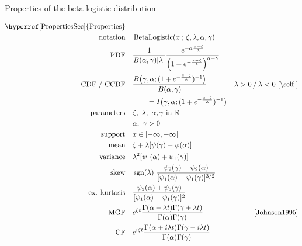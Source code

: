 

\begin{table*}[p]
\caption[Beta-logistic distribution -- Properties]{Properties of the beta-logistic distribution}
\begin{align*}
\text{\hyperref[PropertiesSec]{Properties}}  \quad& \\
\text{notation} \quad &  \op{BetaLogistic}(x\given \pLoc,\pScale,\alpha,\gamma)  
\checked
\\
\text{PDF}\quad &  
\frac{1}{B(\alpha, \gamma) \Left| \pScale\Right|}
 \frac{e^{-\alpha \frac{x-\pLoc}{\pScale} }} { \Left(1 + e^{-\frac{x-\pLoc}{\pScale}  }\Right)^{\alpha+\gamma} }
\checked 
\\
\text{CDF / CCDF} \quad  &  
 \frac{B\big(\gamma, \alpha ;  ( 1+e^{-\frac{x-\pLoc}{\pScale}} )^{-1}  \big) }{B(\alpha,\gamma)}
& \pScale>0 \, \big/ \, \pScale<0 \checked
 \text{ \cite{\self}} \\
& \qquad  = I\big(  \gamma, \alpha;  ( 1+e^{-\frac{x-\pLoc}{\pScale}} )^{-1}  \big) \checked
\\
\text{parameters}\quad &   \pLoc,\ \pScale,\ \alpha, \gamma  \text{ in } \mathbb{R} \checked \\
& \alpha,\ \gamma >0 \checked
\\
\text{support} \quad &   x \in [-\infty,+\infty] \checked
\\
\text{mean} \quad  &  \pLoc +\pScale [ \psi(\gamma)-\psi(\alpha) ]  \checked %
\\
\text{variance} \quad  & \pScale^2 [\psi_1(\alpha) + \psi_1(\gamma) ] \checked %
\\
\text{skew} \quad  &  \op{sgn}(\lambda)\ \frac{ \psi_2(\gamma) - \psi_2(\alpha)}{[\psi_1(\alpha) + \psi_1(\gamma)]^{3/2}} \checked
\\
\text{ex. kurtosis} \quad  &   \frac{\psi_3(\alpha) + \psi_3(\gamma)}{[\psi_1(\alpha) + \psi_1(\gamma)]^{2}} \checked
\\
\text{MGF} \quad  &  e^{ \pLoc t}\frac{\Gamma(\alpha-\pScale  t) \Gamma(\gamma+\pScale t)}{\Gamma(\alpha)\Gamma(\gamma)}
& \text{\cite{Johnson1995}} \checked
\\
\text{CF} \quad  &    e^{i \pLoc t} \frac{\Gamma(\alpha+ i \pScale  t) \Gamma(\gamma-i \pScale t)}{\Gamma(\alpha)\Gamma(\gamma)} \checked
\end{align*}
\end{table*}

